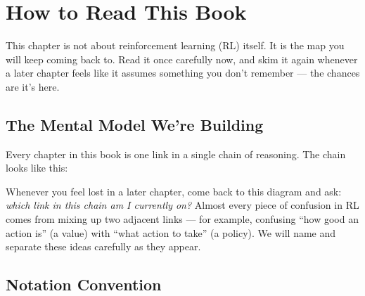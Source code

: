 \chapter{How to Read This Book}
\label{ch:orientation}

This chapter is not about reinforcement learning (RL) itself. It is the map
you will keep coming back to. Read it once carefully now, and skim it again
whenever a later chapter feels like it assumes something you don't
remember — the chances are it's here.

\section{The Mental Model We're Building}

Every chapter in this book is one link in a single chain of reasoning. The
chain looks like this:

\begin{center}
\end{center}

Whenever you feel lost in a later chapter, come back to this diagram and ask:
\emph{which link in this chain am I currently on?} Almost every piece of
confusion in RL comes from mixing up two adjacent links — for example,
confusing ``how good an action is'' (a value) with ``what action to take''
(a policy). We will name and separate these ideas carefully as they appear.

\section{Notation Convention}
\label{sec:notation}

